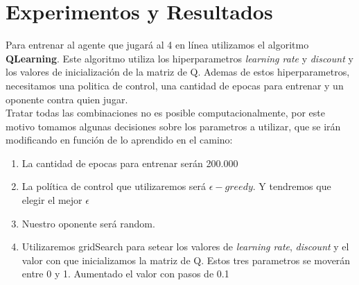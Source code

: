 \section{Experimentos y Resultados}
%
%
%
%
%

Para entrenar al agente que jugará al 4 en línea utilizamos el algoritmo \textbf{QLearning}. Este algoritmo utiliza los hiperparametros \textit{learning rate} y \textit{discount} y los valores de inicialización de la matriz de Q. Ademas de estos hiperparametros, necesitamos una politica de control, una cantidad de epocas para entrenar y un oponente contra quien jugar.  \\

Tratar todas las combinaciones no es posible computacionalmente, por este motivo tomamos algunas decisiones sobre los parametros a utilizar, que se irán modificando en función de lo aprendido en el camino:

\begin{enumerate}
\item La cantidad de epocas para entrenar serán 200.000
\item La política de control que utilizaremos será \textbf{$\epsilon-greedy$}. Y tendremos que elegir el mejor $\epsilon$
\item Nuestro oponente será random.
\item Utilizaremos gridSearch para setear los valores de \textit{learning rate},  \textit{discount} y el valor con que inicializamos la matriz de Q. Estos tres parametros se moverán entre 0 y 1. Aumentado el valor con pasos de 0.1
\end{enumerate}

